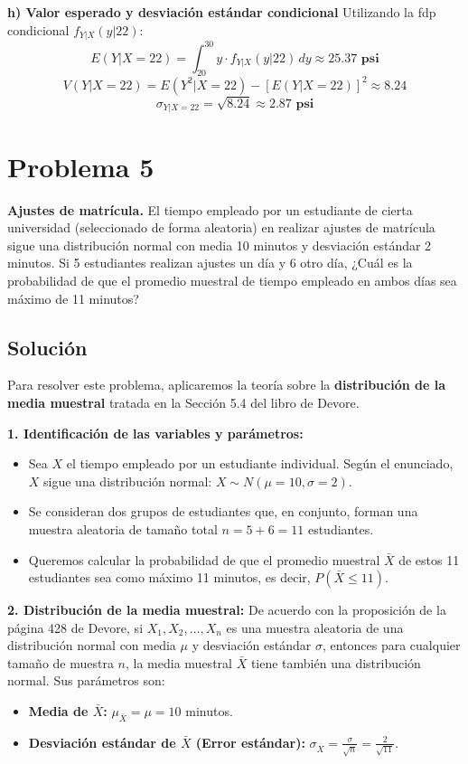 \documentclass[a4paper]{article}
\begin{document}
\textbf{h) Valor esperado y desviación estándar condicional}
Utilizando la fdp condicional $f_{Y|X}(y|22)$:
$$E(Y | X = 22) = \int_{20}^{30} y \cdot f_{Y|X}(y|22) \, dy \approx \mathbf{25.37 \text{ psi}}$$
$$V(Y | X = 22) = E(Y^2 | X = 22) - [E(Y | X = 22)]^2 \approx 8.24$$
$$\sigma_{Y|X=22} = \sqrt{8.24} \approx \mathbf{2.87 \text{ psi}}$$


\section{Problema 5}
\textbf{Ajustes de matrícula.} El tiempo empleado por un estudiante de cierta universidad (seleccionado de forma aleatoria) en realizar ajustes de matrícula sigue una distribución normal con media 10 minutos y desviación estándar 2 minutos. Si 5 estudiantes realizan ajustes un día y 6 otro día, ¿Cuál es la probabilidad de que el promedio muestral de tiempo empleado en ambos días sea máximo de 11 minutos?

\subsection{Solución}

Para resolver este problema, aplicaremos la teoría sobre la \textbf{distribución de la media muestral} tratada en la Sección 5.4 del libro de Devore.

\textbf{1. Identificación de las variables y parámetros:}
\begin{itemize}
    \item Sea $X$ el tiempo empleado por un estudiante individual. Según el enunciado, $X$ sigue una distribución normal: $X \sim N(\mu = 10, \sigma = 2)$.
    \item Se consideran dos grupos de estudiantes que, en conjunto, forman una muestra aleatoria de tamaño total $n = 5 + 6 = 11$ estudiantes.
    \item Queremos calcular la probabilidad de que el promedio muestral $\bar{X}$ de estos 11 estudiantes sea como máximo 11 minutos, es decir, $P(\bar{X} \le 11)$.
\end{itemize}

\textbf{2. Distribución de la media muestral:}
De acuerdo con la proposición de la página 428 de Devore, si $X_1, X_2, \dots, X_n$ es una muestra aleatoria de una distribución normal con media $\mu$ y desviación estándar $\sigma$, entonces para cualquier tamaño de muestra $n$, la media muestral $\bar{X}$ tiene también una distribución normal. Sus parámetros son:
\begin{itemize}
    \item \textbf{Media de $\bar{X}$:} $\mu_{\bar{X}} = \mu = 10$ minutos.
    \item \textbf{Desviación estándar de $\bar{X}$ (Error estándar):} $\sigma_{\bar{X}} = \frac{\sigma}{\sqrt{n}} = \frac{2}{\sqrt{11}}$.
\end{itemize}
\end{document}
